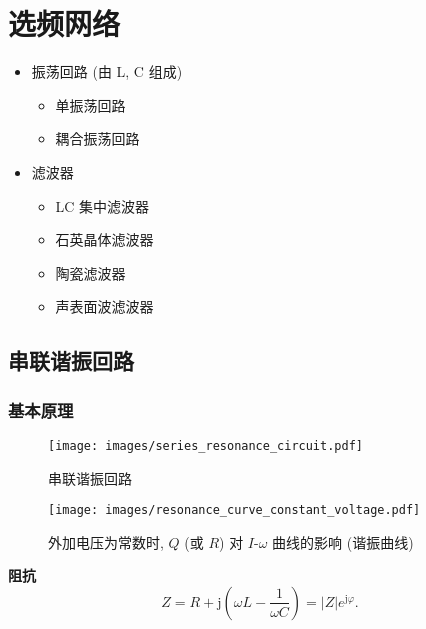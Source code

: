 \section{选频网络}

\begin{itemize}
    \item 振荡回路 (由 L, C 组成)
          \begin{itemize}
              \item 单振荡回路
              \item 耦合振荡回路
          \end{itemize}
    \item 滤波器
          \begin{itemize}
              \item LC 集中滤波器
              \item 石英晶体滤波器
              \item 陶瓷滤波器
              \item 声表面波滤波器
          \end{itemize}
\end{itemize}

\subsection{串联谐振回路}
\subsubsection{基本原理}

\begin{figure}[H]
    \centering
    \begin{minipage}{.342\textwidth}
        \centering
        \texttt{[image: images/series\_resonance\_circuit.pdf]}
        \caption{串联谐振回路}
    \end{minipage}
    \qquad
    \centering
    \begin{minipage}{.358\textwidth}
        \centering
        \texttt{[image: images/resonance\_curve\_constant\_voltage.pdf]}
        \caption{外加电压为常数时, $Q$ (或 $R$) 对 $I$-$\omega$ 曲线的影响 (谐振曲线)}
    \end{minipage}
\end{figure}

\textbf{阻抗}
\begin{equation}
    Z=R+\mathrm{j}\left(\omega L-\frac{1}{\omega C}\right)=|Z|e^{\mathrm{j}\varphi}.
\end{equation}

